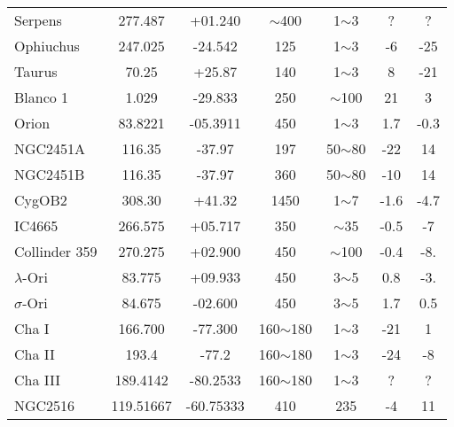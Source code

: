 \begin{table*}
\begin{tabular}{l c c c c c c}
 Serpens   &  277.487    &  +01.240 	 &   $\sim$400    &  1$\sim$3   &  ?    &  ?   \\
 Ophiuchus   &  247.025   &  -24.542 	 &   125    &  1$\sim$3   &  -6    &  -25   \\
 Taurus   &  70.25    &  +25.87 	 &   140    &  1$\sim$3   &  8    &  -21   \\
 Blanco 1   &  1.029    &  -29.833  	 &   250    &  $\sim$100   &  21    &  3   \\
 Orion   &  83.8221     &  -05.3911  	 &   450    &  1$\sim$3   &  1.7    &  -0.3   \\
 NGC2451A   &  116.35       &  -37.97 	 &   197    &  50$\sim$80   &  -22    &  14   \\
 NGC2451B   &  116.35       &  -37.97 	 &   360    &  50$\sim$80   &  -10    &  14   \\
 CygOB2   &  308.30      &  +41.32  	 &   1450    &  1$\sim$7   &  -1.6    &  -4.7   \\
 IC4665   &  266.575     &  +05.717  	 &   350    &  $\sim$35   &  -0.5    &  -7   \\
 Collinder 359   &  270.275      &  +02.900  	 &   450    &  $\sim$100   &  -0.4    &  -8.   \\
 $\lambda$-Ori   &  83.775    &  +09.933  	 &   450    &  3$\sim$5   &  0.8    &  -3.   \\
 $\sigma$-Ori   &  84.675     &  -02.600  	 &   450    &  3$\sim$5   &  1.7    &  0.5   \\
 Cha I   &  166.700       &  -77.300  	 &   160$\sim$180    &  1$\sim$3   &  -21    &  1   \\
 Cha II   &  193.4      &  -77.2   	 &   160$\sim$180    &  1$\sim$3   &  -24    &  -8   \\
 Cha III   &  189.4142     &  -80.2533   	 &   160$\sim$180    &  1$\sim$3   &  ?    &  ?   \\
 NGC2516  &    119.51667  &  -60.75333	 &  410   &  235   &  -4   &  11    \\
\hline
\end{tabular}
\end{table*}

